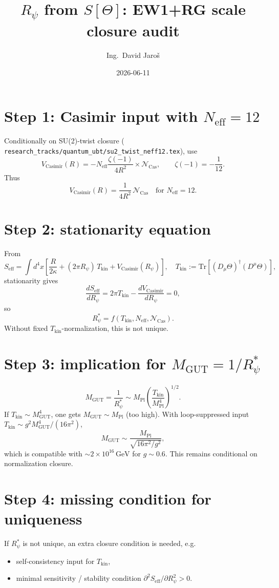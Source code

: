 \documentclass[12pt,a4paper]{article}
\title{$R_\psi$ from $S[\Theta]$: EW1+RG scale closure audit}
\author{Ing.\ David Jaroš}
\date{2026-06-11}
\theoremstyle{remark}
\begin{document}
\maketitle

\section{Step 1: Casimir input with \(N_{\mathrm{eff}}=12\)}
Conditionally on SU(2)-twist closure (
\texttt{research\_tracks/quantum\_ubt/su2\_twist\_neff12.tex}), use
\[
V_{\mathrm{Casimir}}(R)=-N_{\mathrm{eff}}\frac{\zeta(-1)}{4R^2}\times \mathcal{N}_{\mathrm{Cas}},
\qquad \zeta(-1)=-\frac{1}{12}.
\]
Thus
\[
V_{\mathrm{Casimir}}(R)=\frac{1}{4R^2}\,\mathcal{N}_{\mathrm{Cas}}
\quad\text{for }N_{\mathrm{eff}}=12.
\]

\section{Step 2: stationarity equation}
From
\[
S_{\mathrm{eff}}=\int d^4x\left[\frac{R}{2\kappa}+(2\pi R_\psi)\,T_{\mathrm{kin}}+V_{\mathrm{Casimir}}(R_\psi)\right],
\quad
T_{\mathrm{kin}}:=\mathrm{Tr}[(D_\mu\Theta)^\dagger(D^\mu\Theta)],
\]
stationarity gives
\[
\frac{dS_{\mathrm{eff}}}{dR_\psi}=2\pi T_{\mathrm{kin}}-\frac{dV_{\mathrm{Casimir}}}{dR_\psi}=0,
\]
so
\[
R_\psi^*=f(T_{\mathrm{kin}},N_{\mathrm{eff}},\mathcal{N}_{\mathrm{Cas}}).
\]
Without fixed \(T_{\mathrm{kin}}\)-normalization, this is not unique.

\section{Step 3: implication for \(M_{\mathrm{GUT}}=1/R_\psi^*\)}
\[
M_{\mathrm{GUT}}=\frac{1}{R_\psi^*}\sim M_{\mathrm{Pl}}\left(\frac{T_{\mathrm{kin}}}{M_{\mathrm{Pl}}^4}\right)^{1/2}.
\]
If \(T_{\mathrm{kin}}\sim M_{\mathrm{GUT}}^4\), one gets \(M_{\mathrm{GUT}}\sim M_{\mathrm{Pl}}\) (too high).
With loop-suppressed input
\(T_{\mathrm{kin}}\sim g^2M_{\mathrm{GUT}}^4/(16\pi^2)\),
\[
M_{\mathrm{GUT}}\sim \frac{M_{\mathrm{Pl}}}{\sqrt{16\pi^2/g^2}},
\]
which is compatible with \(\sim2\times10^{16}\,\mathrm{GeV}\) for \(g\sim0.6\).
This remains conditional on normalization closure.

\section{Step 4: missing condition for uniqueness}
If \(R_\psi^*\) is not unique, an extra closure condition is needed, e.g.
\begin{itemize}
  \item self-consistency input for \(T_{\mathrm{kin}}\),
  \item minimal sensitivity / stability condition \(\partial^2 S_{\mathrm{eff}}/\partial R_\psi^2>0\).
\end{itemize}
\end{document}

